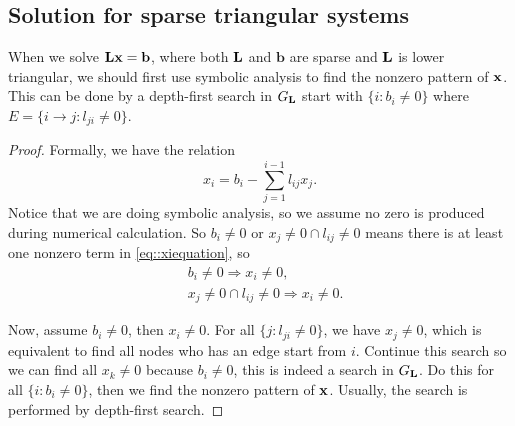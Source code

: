 \subsection{Solution for sparse triangular systems}
\label{section::sparseLxb}
\begin{lem}
    \label{lem::dfs}
    When we solve ${\mathbf{L}}{\mathbf{x}}=\mathbf{b}$, where both ${\mathbf{L}}$ and 
    $\mathbf{b}$ are sparse and ${\mathbf{L}}$ is lower triangular, 
    we should first use symbolic analysis to find the nonzero 
    pattern of ${\mathbf{x}}$. This can be done by a depth-first search 
    in $G_{\mathbf{L}}$ start with $\{i:b_i\neq 0\}$ where 
    $E=\{i\rightarrow j:l_{ji}\neq 0\}$. 
\end{lem}
\begin{proof}
    Formally, we have the relation
    \begin{equation}
        \label{eq::xiequation}
        x_i=b_i-\sum_{j=1}^{i-1}l_{ij}x_j.
    \end{equation}
    Notice that we are doing symbolic analysis, so we assume 
    no zero is produced during numerical calculation. So 
    $b_i\neq 0$ or $x_j\neq 0\cap l_{ij}\neq 0$ means there is 
    at least one nonzero term in \eqref{eq::xiequation}, so 
    \begin{align*}
        &b_{i}\neq 0\Rightarrow x_i\neq 0,\\
        &x_j\neq 0\cap l_{ij}\neq 0\Rightarrow x_i\neq 0.
    \end{align*}

    Now, assume $b_i\neq 0$, then $x_i\neq 0$. For all 
    $\{j:l_{ji}\neq 0\}$, we have $x_j\neq 0$, which is 
    equivalent to find all nodes who has an edge start from 
    $i$. Continue this search so we can find all $x_k\neq 0$ 
    because $b_i\neq 0$, this is indeed a search in 
    $G_{\mathbf{L}}$. Do this for all $\{i:b_i\neq 0\}$, then we 
    find the nonzero pattern of ${\mathbf{x}}$. Usually, the search is 
    performed by depth-first search.
\end{proof}

